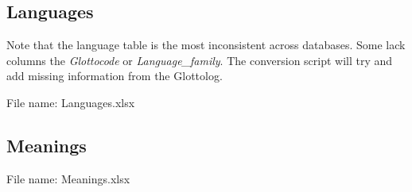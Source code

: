 \documentclass[12pt,a4paper]{scrartcl}
\begin{document}
\newpage%
\subsection{Languages}

Note that the language table is the most inconsistent across databases.
Some lack columns the \emph{Glottocode} or \emph{Language\_family}.
The conversion script will try and add missing information from the Glottolog.

File name: Languages.xlsx

\noindent{}

\newpage%
\subsection{Meanings}

File name: Meanings.xlsx

\noindent{}
\end{document}
